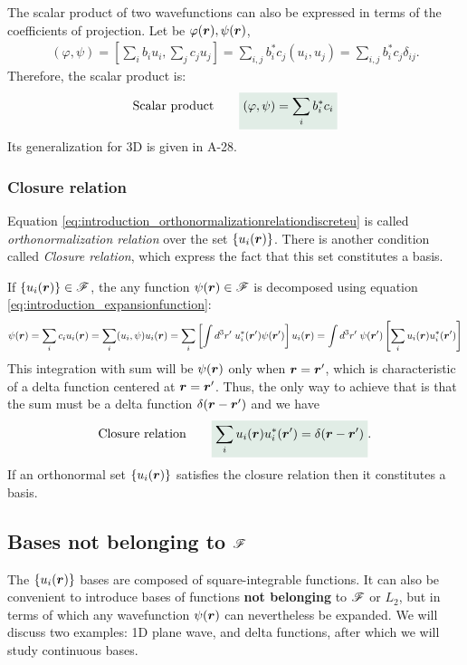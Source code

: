 The scalar product of two wavefunctions can also be expressed in terms of the coefficients of projection. Let be $\varphi(\bm{r}),\psi(\bm{r})$,
\begin{align}
    (\varphi,\psi)=\left[\sum_ib_iu_i,\sum_jc_ju_j\right]=\sum_{i,j}b_i^*c_j(u_i,u_j)=\sum_{i,j}b_i^*c_j\delta_{ij}.
\end{align}
Therefore, the scalar product is:
\begin{align}
    \text{Scalar product}\qquad\highlight{(\varphi,\psi)=\sum_ib_i^*c_i}
\end{align}
Its generalization for 3D is given in A-28.

\subsubsection{Closure relation}
Equation \eqref{eq:introduction_orthonormalizationrelationdiscreteu} is called \emph{orthonormalization relation} over the set $\{u_i(\bm{r})\}$. There is another 
condition called \emph{Closure relation}, which express the fact that this set constitutes a basis.

If $\{u_i(\bm{r})\}\in\mathscr{F}$, the any function $\psi(\bm{r})\in\mathscr{F}$ is decomposed using equation \eqref{eq:introduction_expansionfunction}:
\begin{align*}
    \psi(\bm{r})=\sum_ic_iu_i(\bm{r})=\sum_i(u_i,\psi)u_i(\bm{r})=\sum_i\left[\int d^3r'\;u_i^*(\bm{r}')\psi(\bm{r}')\right]u_i(\bm{r})=\int d^3r'\;\psi(\bm{r}')\left[\sum_iu_i(\bm{r})u_i^*(\bm{r}')\right]
\end{align*}
This integration with sum will be $\psi(\bm{r})$ only when $\bm{r}=\bm{r}'$, which is characteristic of a delta function centered at $\bm{r}=\bm{r}'$. Thus, the only way to 
achieve that is that the sum must be a delta function $\delta(\bm{r}-\bm{r}')$ and we have
\begin{align}
    \text{Closure relation}\qquad\highlight{\sum_iu_i(\bR)u_i^*(\bR')=\delta(\bR-\bR')}.
    \label{eq:introduction_closurerelationdiscreteu}
\end{align}
If an orthonormal set $\{u_i(\bm{r})\}$ satisfies the closure relation then it constitutes a basis. 

\subsection{Bases not belonging to $\mathscr{F}$}
The $\{u_i(\bm{r})\}$ bases are composed of square-integrable functions. It can also be convenient to introduce bases of functions \textbf{not belonging} to $\mathscr{F}$ or $L_2$, 
but in terms of which any wavefunction $\psi(\bm{r})$ can nevertheless be expanded. We will discuss two examples: 1D plane wave, and delta functions, after which we will 
study continuous bases.
